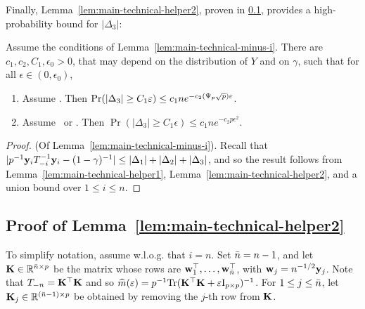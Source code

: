 \documentclass[times,sort&compress,3p]{elsarticle}
\begin{document}
Finally, Lemma~\ref{lem:main-technical-helper2}, proven in \ref{sec:proof-lem:main-technical-helper2},  provides a high-probability bound for $|\Delta_3|$:

\begin{lemma}\label{lem:main-technical-helper2}
    Assume the conditions of Lemma~\ref{lem:main-technical-minus-i}.
    There are $c_1,c_2,C_1,\epsilon_0>0$, that may depend on the distribution of $Y$ and on $\gamma$, such that for all $\epsilon\in (0,\epsilon_0)$,
    \begin{enumerate}
        \item Assume \AssumLC. Then $\Pr(|\Delta_3|\ge C_1\varepsilon) \le c_1ne^{-c_2(\Psi_p\sqrt{p})\varepsilon}$.
        \item Assume \AssumIndep~or \AssumCCPSB. Then $\Pr(|\Delta_3|\ge C_1\epsilon) \le c_1ne^{-c_2p\epsilon^2}$.
    \end{enumerate}
\end{lemma}
\begin{proof}
    (Of Lemma~\ref{lem:main-technical-minus-i}). Recall that $|p^{-1}{\bf y}_iT_{-i}^{-1}{\bf y}_i - (1-\gamma)^{-1}| \le |\Delta_1| + |\Delta_2| + |\Delta_3|$, and so the result follows from Lemma~\ref{lem:main-technical-helper1}, Lemma~\ref{lem:main-technical-helper2}, and a union bound over $1\le i \le n$.
\end{proof}

\subsection{Proof of Lemma~\ref{lem:main-technical-helper2}}
\label{sec:proof-lem:main-technical-helper2}

To simplify notation, assume w.l.o.g. that $i=n$. Set $\bar{n}=n-1$, and let ${\bf K}\in \mathbb{R}^{\bar{n}\times p}$ be the matrix whose rows are ${\bf w}_1^\top,\ldots,{\bf w}_{\bar{n}}^\top$, with ${\bf w}_j=n^{-1/2}{\bf y}_j$. Note that $T_{-n}= {\bf K}^\top {\bf K}$ and so $\widehat{m}(\varepsilon)=p^{-1}\textrm{Tr}({\bf K}^\top{\bf K} + \varepsilon\mathrm{I}_{p \times p})^{-1}$. For $1\le j \le \bar{n}$, let ${\bf K}_j\in \mathbb{R}^{(\bar{n}-1)\times p}$ be obtained by removing the $j$-th row from ${\bf K}$.  
\end{document}
